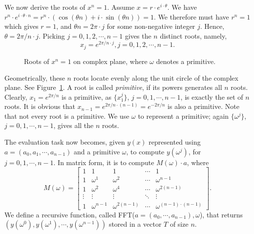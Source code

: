 We now derive the roots of $x^n = 1$. Assume $x = r\cdot e^{i\cdot \theta}$.
We have $r^n \cdot e^{i\cdot \theta \cdot n} = r^n \cdot (\cos(\theta  n) + i\cdot \sin(\theta n)) = 1$.
We therefore must have $r^n = 1$ which gives $r = 1$, and $\theta n = 2\pi \cdot j$ for some non-negative integer $j$.
Hence, $\theta = 2 \pi / n \cdot j$. Picking $j = 0, 1, 2, \cdots, n - 1$ gives the $n$ distinct roots,
namely, 
\[  x_j = e^{2 \pi/ n \cdot j}, j = 0, 1, 2, \cdots, n-1. \]

\begin{figure}[t!]
\centering{}
\caption{Roots of $x^n = 1$ on complex plane, where $\omega$ denotes a primitive.}
\label{fig:roots}
\end{figure}

Geometrically, these $n$ roots locate evenly along the unit circle of the complex plane.
See Figure~\ref{fig:roots}.
A root is called \emph{primitive}, if its powers generates all $n$ roots.
Clearly, $x_1 = e^{2\pi/n}$ is a primitive, as $\{x_1^j\}$, $j = 0, 1, \cdots, n-1$,
is exactly the set of $n$ roots. It is obvious that 
$x_{n-1} = e^{2\pi/n\cdot (n-1)} = e^{-2\pi/n}$ is also a primitive.
Note that not every root is a primitive.
We use $\omega$ to represent a primitive; again 
$\{\omega^j\}$, $j = 0, 1, \cdots, n-1$, gives all the $n$ roots.

The evaluation task now becomes, given $y(x)$ represented using $a = (a_0, a_1, \cdots, a_{n-1})$ and a primitive $\omega$,
to compute $y(\omega^j)$, for $j =0, 1, \cdots, n-1$. In matrix form, it is to compute $M(\omega) \cdot a$, where 
\[
M(\omega) =
\begin{bmatrix}
1 & 1 & 1 & \cdots & 1 \\
1 & \omega^1 & \omega^2 & \cdots & \omega^{n-1} \\
1 & \omega^2 & \omega^4 & \cdots & \omega^{2(n-1)} \\
\vdots & \vdots & \vdots & \ddots & \vdots \\
1 & \omega^{n-1} & \omega^{2(n-1)} & \cdots & \omega^{(n-1)\cdot(n-1)}
\end{bmatrix}.
\]
We define a recursive function, called FFT($a = (a_0, \cdots, a_{n-1}), \omega$), that returns
$(y(\omega^0), y(\omega^1), \cdots, y(\omega^{n-1}))$ stored in a vector $T$ of size $n$.

